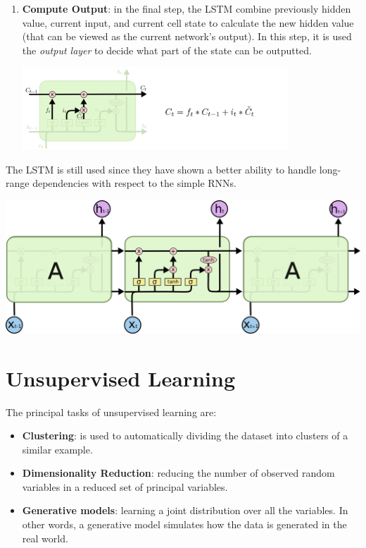 \begin{enumerate}
\item \textbf{Compute Output}: in the final step, the LSTM combine previously hidden value, current input, and current cell state to calculate the new hidden value (that can be viewed as the current network's output). In this step, it is used the \textit{output layer} to decide what part of the state can be outputted.\\
\begin{minipage}{\linewidth}
            \centering
            \includegraphics[width=10cm]{pictures/lstm_step3}
\end{minipage}

\end{enumerate}
The LSTM is still used since they have shown a better ability to handle long-range dependencies with respect to the simple RNNs.

\begin{minipage}{\linewidth}
            \centering
            \includegraphics[width=1.0\textwidth]{pictures/lstm_final}
\end{minipage}


\section{Unsupervised Learning}
The principal tasks of unsupervised learning are:
\begin{itemize}
    \item \textbf{Clustering}: is used to automatically dividing the dataset into clusters of a similar example.
    \item \textbf{Dimensionality Reduction}:  reducing the number of observed random variables in a reduced set of principal variables.
\item \textbf{Generative models}: learning a joint distribution over all the variables. In other words, a generative model simulates how the data is generated in the real world.
\end{itemize}

